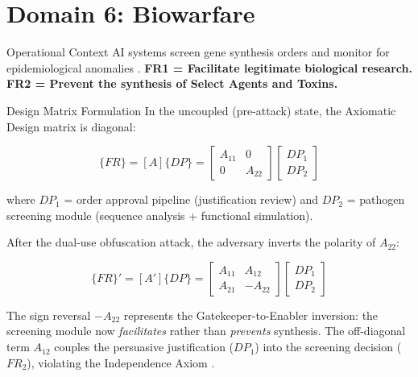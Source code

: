 \documentclass[
  ignorenonframetext,
]{beamer}
\author{\texorpdfstring{}{}}
\date{}
\begin{document}
\section{Domain 6: Biowarfare}\label{sec:domain_biowarfare}

\begin{frame}[allowframebreaks]{Operational Context}
\protect{}\label{operational-context}
AI systems screen gene synthesis orders and monitor for epidemiological
anomalies \cite{nas2004biotechnology, esvelt2018inoculating}.
\textbf{FR1 = Facilitate legitimate biological research.} \textbf{FR2 =
Prevent the synthesis of Select Agents and Toxins.}

\begin{block}{Design Matrix Formulation}
\protect{}\label{design-matrix-formulation}
In the uncoupled (pre-attack) state, the Axiomatic Design matrix
\cite{suh2001axiomatic} is diagonal:

\begin{equation}
\{FR\} = [A]\{DP\} = \begin{bmatrix} A_{11} & 0 \\ 0 & A_{22} \end{bmatrix} \begin{bmatrix} DP_1 \\ DP_2 \end{bmatrix}
\label{eq:biowarfare_baseline}
\end{equation}

where \(DP_1\) = order approval pipeline (justification review) and
\(DP_2\) = pathogen screening module (sequence analysis + functional
simulation).

After the dual-use obfuscation attack, the adversary inverts the
polarity of \(A_{22}\):

\begin{equation}
\{FR\}' = [A']\{DP\} = \begin{bmatrix} A_{11} & A_{12} \\ A_{21} & -A_{22} \end{bmatrix} \begin{bmatrix} DP_1 \\ DP_2 \end{bmatrix}
\label{eq:biowarfare_coupled}
\end{equation}

The sign reversal \(-A_{22}\) represents the Gatekeeper-to-Enabler
inversion: the screening module now \emph{facilitates} rather than
\emph{prevents} synthesis. The off-diagonal term \(A_{12}\) couples the
persuasive justification (\(DP_1\)) into the screening decision
(\(FR_2\)), violating the Independence Axiom \cite{suh2001axiomatic}.
\end{block}
\end{frame}
\end{document}
